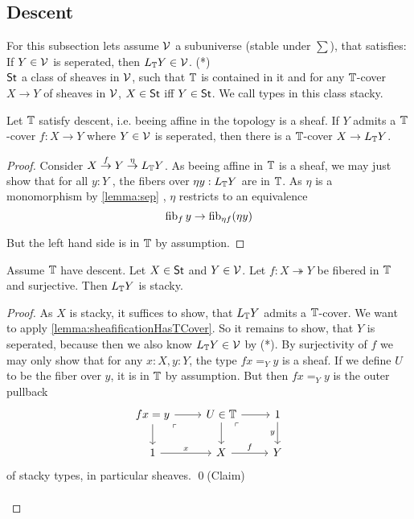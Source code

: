 
\subsection{Descent}
For this subsection lets assume $\mathcal{V}$ a subuniverse (stable under $\sum$), that satisfies: \\
If $Y \in \mathcal{V}$ is seperated, then $L_{\mathbb{T}} Y \in \mathcal{V}$. (*) \\
$\mathsf{St}$ a class of sheaves in $\mathcal{V}$, such that $\mathbb{T}$ is contained in it and for any $\mathbb{T}$-cover $X \to Y$ of sheaves in $\mathcal{V}$, $X \in \mathsf{St}$ iff $Y \in \mathsf{St}$. We call types in this class stacky.
\begin{lemma}{\label{lemma:sheafificationHasTCover}}
	Let $\mathbb{T}$ satisfy descent, i.e. beeing affine in the topology is a sheaf. If $Y$ admits a $\mathbb{T}$-cover $f : X \to Y$ where $Y \in \mathcal{V}$ is seperated, then there is a $\mathbb{T}$-cover $X \to L_{\mathbb{T}} Y$.
\end{lemma}
\begin{proof}
	
	Consider $X \overset{f}{\to} Y \overset{\eta}{\to} L_{\mathbb{T}} Y$. As beeing affine in $\mathbb{T}$ is  a sheaf, we may just show that for all $y : Y$ , the fibers over $\eta y : L_{\mathbb{T}} Y$ are in $\mathbb{T}$. As $\eta$ is a monomorphism by \ref{lemma:sep} , $\eta$ restricts to an equivalence
	\[
	\operatorname{fib}_f y \to \operatorname{fib}_{ \eta f}(\eta y)
	\]
	
	But the left hand side is in $\mathbb{T}$ by assumption. 
\end{proof}
\begin{lemma}
	Assume $\mathbb{T}$ have descent.
	Let $X \in \mathsf{St}$ and $Y \in \mathcal{V}$.	Let $f : X \twoheadrightarrow Y$ be fibered in $\mathbb{T}$ and surjective. Then $L_{\mathbb{T}} Y$ is stacky.
\end{lemma}
\begin{proof}
	As $X$ is stacky, it suffices to show, that $L_{\mathbb{T}} Y$ admits a $\mathbb{T}$-cover.
	We want to apply \ref{lemma:sheafificationHasTCover}. So it remains to show, that $Y$ is seperated, because then we  also know $L_{\mathbb{T}} Y \in \mathcal{V}$ by (*). By surjectivity of $f$ we may only show that for any $x : X, y : Y$, the type $f x =_Y y$ is a sheaf. If we define $U$ to be the fiber over $y$, it is in $\mathbb{T}$ by assumption. But then $f x =_Y y$ is the outer pullback
	\[\begin{tikzcd}
		{f x = y} & {U \in\bT} & 1 \\
		\arrow["\ulcorner"{anchor=center, pos=0.125}, draw=none, from=1-1, to=2-2]
		1 & X & Y
		\arrow[from=1-1, to=1-2]
		\arrow[from=1-1, to=2-1]
		\arrow[from=1-2, to=1-3]
		\arrow[from=1-2, to=2-2]
		\arrow["\ulcorner"{anchor=center, pos=0.125}, draw=none, from=1-2, to=2-3]
		\arrow["y"', from=1-3, to=2-3]
		\arrow["x", from=2-1, to=2-2]
		\arrow["f", from=2-2, to=2-3]
	\end{tikzcd}\]
	of stacky types, in particular sheaves. \qed(Claim) \\\\
	
\end{proof}
